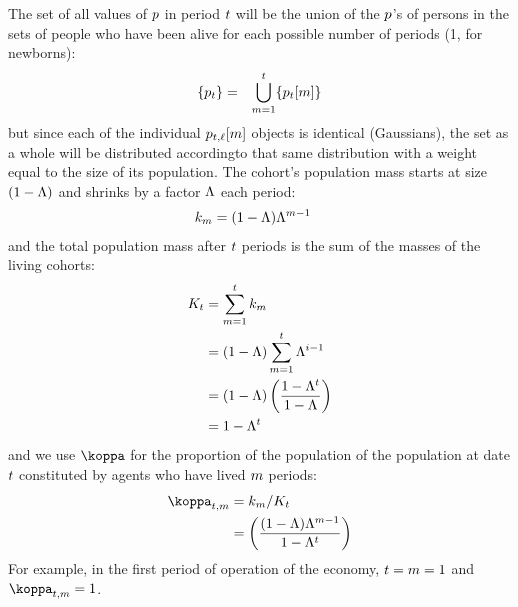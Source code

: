 \documentclass[\econtexRoot/BufferStockTheory.tex]{subfiles}
\begin{document}
\newpage
The set of all values of $p$ in period $t$ will be the union of the $p$'s of persons in the sets of people who have been alive for each possible number of periods (1, for newborns):
\begin{eqnarray}
  \{p_{t}\} & = & \bigcup_{m=1}^{t}\{p_{t}[m]\}
\end{eqnarray}
but since each of the individual $p_{t,\ell}[m]$ objects is identical (Gaussians), the set as a whole will be distributed accordingto that same distribution with a weight equal to the size of its population.  The cohort's population mass starts at size $(1-\Lambda)$ and shrinks by a factor $\Lambda$ each period:
\begin{equation}\begin{gathered}\begin{aligned}
  k_{m} & =  (1-\Lambda)\Lambda^{m-1} \label{eq:mass}
\end{aligned}\end{gathered}\end{equation}
and the total population mass after $t$ periods is the sum of the masses of the living cohorts:
\begin{align*}
  K_{t} & =  \sum_{m=1}^{t}k_{m}
  \\ & =  (1-\Lambda)\sum_{m=1}^{t}\Lambda^{i-1}
  \\ & =  (1-\Lambda)\left(\frac{1-\Lambda^{t}}{1-\Lambda}\right)
  \\ & = 1-\Lambda^{t}
\end{align*}
and we use $\wgt$ for the proportion of the population of the population at date $t$ constituted by agents who have lived $m$ periods:
\begin{equation}\begin{gathered}\begin{aligned}
  \wgt_{\FutPer,\LooPer} & =  \mass_{\LooPer}/\Mass_{\FutPer} \label{eq:wgt}
  \\ & = \left(\frac{(1-\Liv)\Liv^{\LooPer-1}}{1-\Liv^{\FutPer}}\right) \notag
\end{aligned}\end{gathered}\end{equation}
For example, in the first period of operation of the economy, $t=m=1$ and $\wgt_{\FutPer,\LooPer}=1$.
\end{document}

